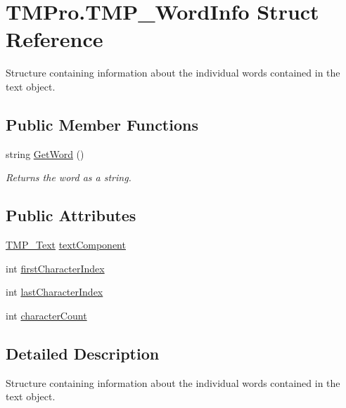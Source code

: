 \hypertarget{struct_t_m_pro_1_1_t_m_p___word_info}{}\section{T\+M\+Pro.\+T\+M\+P\+\_\+\+Word\+Info Struct Reference}
\label{struct_t_m_pro_1_1_t_m_p___word_info}


Structure containing information about the individual words contained in the text object.  


\subsection*{Public Member Functions}
\begin{DoxyCompactItemize}
\item 
string \mbox{\hyperlink{struct_t_m_pro_1_1_t_m_p___word_info_a18da9e9a1373dc163f1da528d23849b3}{Get\+Word}} ()
\begin{DoxyCompactList}\small\item\em Returns the word as a string. \end{DoxyCompactList}\end{DoxyCompactItemize}
\subsection*{Public Attributes}
\begin{DoxyCompactItemize}
\item 
\mbox{\hyperlink{class_t_m_pro_1_1_t_m_p___text}{T\+M\+P\+\_\+\+Text}} \mbox{\hyperlink{struct_t_m_pro_1_1_t_m_p___word_info_a5e83201afcc22882ca9131b1a3868d29}{text\+Component}}
\item 
int \mbox{\hyperlink{struct_t_m_pro_1_1_t_m_p___word_info_a90c0f4fe19fdda6f9159dc2917bee776}{first\+Character\+Index}}
\item 
int \mbox{\hyperlink{struct_t_m_pro_1_1_t_m_p___word_info_a34962a75f3d6228e01eea0f1c076d439}{last\+Character\+Index}}
\item 
int \mbox{\hyperlink{struct_t_m_pro_1_1_t_m_p___word_info_a238e4a5e9fa4f36ba464e4167751d170}{character\+Count}}
\end{DoxyCompactItemize}


\subsection{Detailed Description}
Structure containing information about the individual words contained in the text object. 



